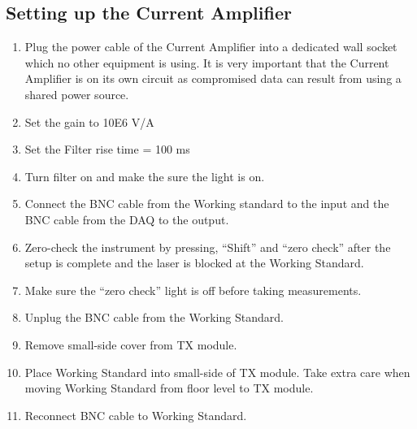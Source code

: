 \subsection{Setting up the Current Amplifier}
\begin{enumerate}
\item Plug the power cable of the Current Amplifier into a dedicated wall socket which no other equipment is using.  It is very important that the Current Amplifier is on its own circuit as compromised data can result from using a shared power source.
\item Set the gain to 10E6 V/A
\item Set the Filter rise time = 100 ms
\item Turn filter on and make the sure the light is on.
\item Connect the BNC cable from the Working standard to the input and the BNC cable from the DAQ to the output. 
\item Zero-check the instrument by pressing, “Shift” and “zero check” after the setup is complete and the laser is blocked at the Working Standard.
\item Make sure the “zero check” light is off before taking measurements.
\item Unplug the BNC cable from the Working Standard.
\item Remove small-side cover from TX module.
\item Place Working Standard into small-side of TX module.  Take extra care when moving Working Standard from floor level to TX module.
\item Reconnect BNC cable to Working Standard.
\end{enumerate}

